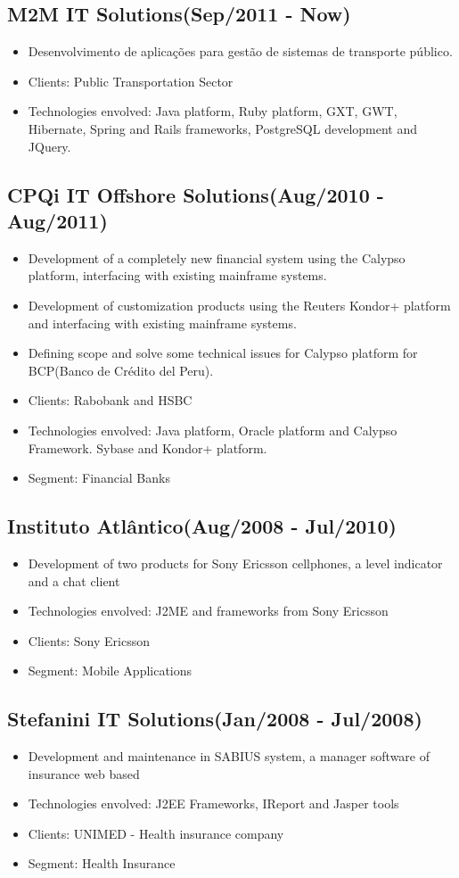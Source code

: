 \documentclass[letterpaper]{article}
\begin{document}
\subsection*{M2M IT Solutions(Sep/2011 - Now)}
\begin{itemize}
\item Desenvolvimento de aplicações para gestão de sistemas de transporte público.
\item Clients: Public Transportation Sector
\item Technologies envolved: Java platform, Ruby platform, GXT, GWT, Hibernate, Spring and Rails frameworks, PostgreSQL development and JQuery.
\end{itemize}
\subsection*{CPQi IT Offshore Solutions(Aug/2010 - Aug/2011)}
\begin{itemize}
\item Development of a completely new financial system using the Calypso platform, interfacing with existing mainframe systems.
\item Development of customization products using the Reuters Kondor+ platform and interfacing with existing mainframe systems.
\item Defining scope and solve some technical issues for Calypso platform for BCP(Banco de Crédito del Peru).
\item Clients: Rabobank and HSBC
\item Technologies envolved: Java platform, Oracle platform and Calypso Framework. Sybase and Kondor+ platform.
\item Segment: Financial Banks
\end{itemize}
\subsection*{Instituto Atlântico(Aug/2008 - Jul/2010)}
\begin{itemize}
\item Development of two products for Sony Ericsson cellphones, a level indicator and a chat client
\item Technologies envolved: J2ME and frameworks from Sony Ericsson
\item Clients: Sony Ericsson
\item Segment: Mobile Applications
\end{itemize}
\subsection*{Stefanini IT Solutions(Jan/2008 - Jul/2008)}
\begin{itemize}
\item Development and maintenance in SABIUS system, a manager software of insurance web based
\item Technologies envolved: J2EE Frameworks, IReport and Jasper tools
\item Clients: UNIMED - Health insurance company
\item Segment: Health Insurance
\end{itemize}
\end{document}
